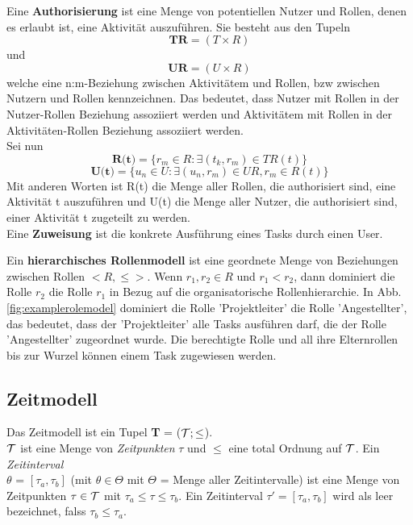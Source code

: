 Eine \textbf{Authorisierung} ist eine Menge von potentiellen Nutzer und Rollen, denen es erlaubt ist, eine Aktivität auszuführen. Sie besteht aus den Tupeln $$\textbf{TR} = (T\times R)$$ und $$\textbf{UR} = (U\times R)$$
 welche eine n:m-Beziehung zwischen Aktivitätem und Rollen, bzw zwischen Nutzern und Rollen kennzeichnen. Das bedeutet, dass Nutzer mit Rollen in der Nutzer-Rollen Beziehung assoziiert werden und Aktivitätem mit Rollen in der Aktivitäten-Rollen Beziehung assoziiert werden.\\
Sei nun $$\textbf{R(t)} = \{r_m \in R: \exists(t_k, r_m) \in TR(t)\}$$
$$\textbf{U(t)} = \{u_n \in U: \exists(u_n, r_m) \in UR, r_m \in R(t)\}$$
Mit anderen Worten ist R(t) die Menge aller Rollen, die authorisiert sind, eine Aktivität t auszuführen und U(t) die Menge aller Nutzer, die authorisiert sind, einer Aktivität t zugeteilt zu werden.\\
Eine \textbf{Zuweisung} ist die konkrete Ausführung eines Tasks durch einen User.

Ein \textbf{hierarchisches Rollenmodell} ist eine geordnete Menge von Beziehungen zwischen Rollen $<R, \leq>$. Wenn $r_1, r_2 \in R$ und $r_1 < r_2$, dann dominiert die Rolle $r_2$ die Rolle $r_1$ in Bezug auf die organisatorische Rollenhierarchie. In Abb. \ref{fig:examplerolemodel} dominiert die Rolle 'Projektleiter' die Rolle 'Angestellter', das bedeutet, dass der 'Projektleiter' alle Tasks ausführen darf, die der Rolle 'Angestellter' zugeordnet wurde.
Die berechtigte Rolle und all ihre Elternrollen bis zur Wurzel können einem Task zugewiesen werden.

\cite{wolter_modeling_of_TBAC_in_BPMN}

\subsection{Zeitmodell}
Das Zeitmodell ist ein Tupel \textbf{T} = ($\mathcal{T};\leq$).\\
$\mathcal{T}$ ist eine Menge von \textit{Zeitpunkten} $\tau$ und $\leq$ eine total Ordnung auf $\mathcal{T}$.
Ein \textit{Zeitinterval} \\$\theta$ = $[\tau_a, \tau_b]$ (mit $\theta \in \Theta$ mit $\Theta$ = Menge aller Zeitintervalle) ist eine Menge von Zeitpunkten $\tau \in \mathcal{T}$ mit $\tau_a \leq \tau \leq \tau_b$.
Ein Zeitinterval $\tau' = [\tau_a, \tau_b]$ wird als leer bezeichnet, falss $\tau_b \leq \tau_a$. \cite{warner_inter_instance}

